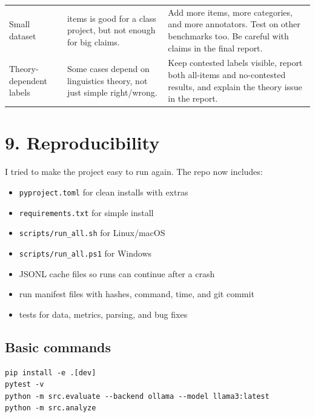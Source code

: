 \documentclass[11pt, a4paper]{article}
\begin{document}
\begin{table}[htbp]
\begin{tabularx}{\textwidth}{>{\raggedright\arraybackslash}p{3.5cm} >{\raggedright\arraybackslash}p{4.3cm} >{\raggedright\arraybackslash}X}
Small dataset & 180 items is good for a class project, but not enough for big claims. & Add more items, more categories, and more annotators. Test on other benchmarks too. Be careful with claims in the final report. \\
\rowcolor{rowtint}
Theory-dependent labels & Some cases depend on linguistics theory, not just simple right/wrong. & Keep contested labels visible, report both all-items and no-contested results, and explain the theory issue in the report. \\
\bottomrule
\end{tabularx}
\end{table}

\FloatBarrier
{}
\section*{\color{bambergnavy} 9. Reproducibility}
I tried to make the project easy to run again. The repo now includes:
\begin{itemize}[leftmargin=*]
    \item \texttt{pyproject.toml} for clean installs with extras
    \item \texttt{requirements.txt} for simple install
    \item \texttt{scripts/run\_all.sh} for Linux/macOS
    \item \texttt{scripts/run\_all.ps1} for Windows
    \item JSONL cache files so runs can continue after a crash
    \item run manifest files with hashes, command, time, and git commit
    \item tests for data, metrics, parsing, and bug fixes
\end{itemize}

\subsection*{\color{bambergnavy} Basic commands}
\begin{verbatim}
pip install -e .[dev]
pytest -v
python -m src.evaluate --backend ollama --model llama3:latest
python -m src.analyze
\end{verbatim}

\FloatBarrier
{}
\end{document}
